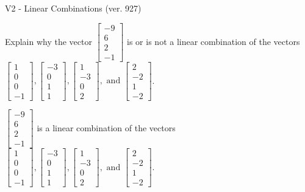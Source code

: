 \begin{exercise}
  \begin{exerciseTitle}V2 - Linear Combinations (ver. 927)\end{exerciseTitle}
  \begin{exerciseStatement}
    Explain why the vector \(\left[\begin{array}{c}
-9 \\
6 \\
2 \\
-1
\end{array}\right]\)  is or is not a linear 
	combination of the vectors \(\left[\begin{array}{c}
1 \\
0 \\
0 \\
-1
\end{array}\right] , \left[\begin{array}{c}
-3 \\
0 \\
1 \\
1
\end{array}\right] , \left[\begin{array}{c}
1 \\
-3 \\
0 \\
2
\end{array}\right] , \text{ and } \left[\begin{array}{c}
2 \\
-2 \\
1 \\
-2
\end{array}\right]\).
	


  \end{exerciseStatement}
  \begin{exerciseAnswer}
   \(\left[\begin{array}{c}
-9 \\
6 \\
2 \\
-1
\end{array}\right]\) 
  	 is  
	a linear combination of the vectors \(\left[\begin{array}{c}
1 \\
0 \\
0 \\
-1
\end{array}\right] , \left[\begin{array}{c}
-3 \\
0 \\
1 \\
1
\end{array}\right] , \left[\begin{array}{c}
1 \\
-3 \\
0 \\
2
\end{array}\right] , \text{ and } \left[\begin{array}{c}
2 \\
-2 \\
1 \\
-2
\end{array}\right]\).


\end{exerciseAnswer}
\end{exercise}
